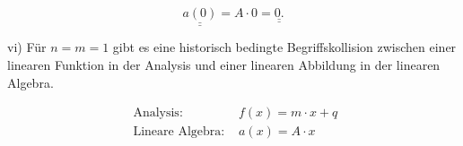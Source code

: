 \documentclass[10pt]{article}
\begin{document}
\begin{equation*}
\underline{\underline{a(0)}}=A \cdot 0=\underline{\underline{0 .}} \tag{6.35}
\end{equation*}


vi) Für $n=m=1$ gibt es eine historisch bedingte Begriffskollision zwischen einer linearen Funktion in der Analysis und einer linearen Abbildung in der linearen Algebra.


\begin{align*}
\text { Analysis: } & f(x)=m \cdot x+q \\
\text { Lineare Algebra: } & a(x)=A \cdot x \tag{6.36}
\end{align*}
\end{document}
